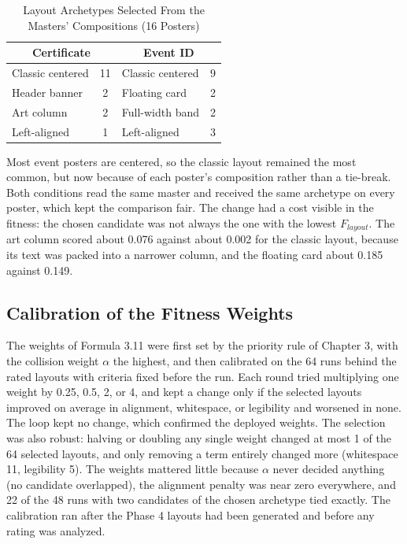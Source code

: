 \begin{refsection}
\begin{table}[ht]
\centering
\caption{Layout Archetypes Selected From the Masters' Compositions (16 Posters)}
\label{tab:archetypes}
\small
\begin{tabular}{l c l c}
\hline
\multicolumn{2}{c}{\textbf{Certificate}} & \multicolumn{2}{c}{\textbf{Event ID}} \\ \hline
Classic centered & 11 & Classic centered & 9 \\
Header banner & 2 & Floating card & 2 \\
Art column & 2 & Full-width band & 2 \\
Left-aligned & 1 & Left-aligned & 3 \\ \hline
\end{tabular}
\end{table}

Most event posters are centered, so the classic layout remained the most common, but now because of each poster's composition rather than a tie-break. Both conditions read the same master and received the same archetype on every poster, which kept the comparison fair. The change had a cost visible in the fitness: the chosen candidate was not always the one with the lowest $F_{layout}$. The art column scored about 0.076 against about 0.002 for the classic layout, because its text was packed into a narrower column, and the floating card about 0.185 against 0.149.

\subsection{Calibration of the Fitness Weights}

The weights of Formula 3.11 were first set by the priority rule of Chapter 3, with the collision weight $\alpha$ the highest, and then calibrated on the 64 runs behind the rated layouts with criteria fixed before the run. Each round tried multiplying one weight by 0.25, 0.5, 2, or 4, and kept a change only if the selected layouts improved on average in alignment, whitespace, or legibility and worsened in none. The loop kept no change, which confirmed the deployed weights. The selection was also robust: halving or doubling any single weight changed at most 1 of the 64 selected layouts, and only removing a term entirely changed more (whitespace 11, legibility 5). The weights mattered little because $\alpha$ never decided anything (no candidate overlapped), the alignment penalty was near zero everywhere, and 22 of the 48 runs with two candidates of the chosen archetype tied exactly. The calibration ran after the Phase 4 layouts had been generated and before any rating was analyzed.


\end{refsection}
